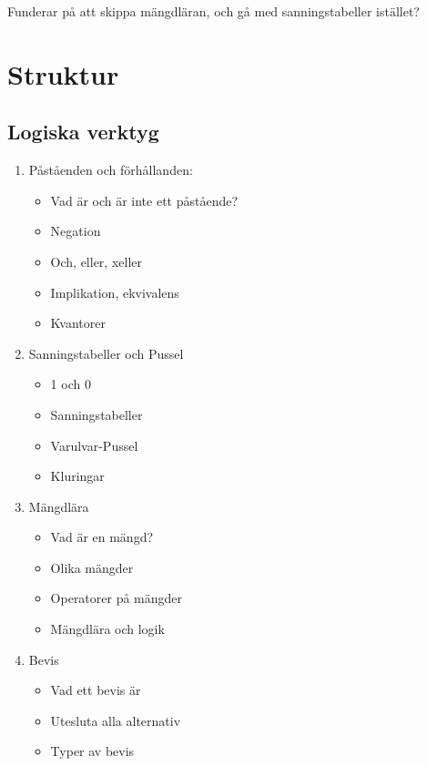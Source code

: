 Funderar på att skippa mängdläran, och gå med sanningstabeller istället?

\newpage 
\section{Struktur}
\subsection{Logiska verktyg}
\begin{enumerate}
	\item Påståenden och förhållanden:
		\begin{itemize}
			\item Vad är och är inte ett påstående?
			\item Negation
			\item Och, eller, xeller
			\item Implikation, ekvivalens
			\item Kvantorer
		\end{itemize}
	\item Sanningstabeller och Pussel
		\begin{itemize}
			\item 1 och 0
			\item Sanningstabeller
			\item Varulvar-Pussel
			\item Kluringar
		\end{itemize}
	\item Mängdlära
		\begin{itemize}
			\item Vad är en mängd?
			\item Olika mängder
			\item Operatorer på mängder
			\item Mängdlära och logik
		\end{itemize}
	\item Bevis
		\begin{itemize}
			\item Vad ett bevis är
			\item Utesluta alla alternativ
			\item Typer av bevis
		\end{itemize}
\end{enumerate}

